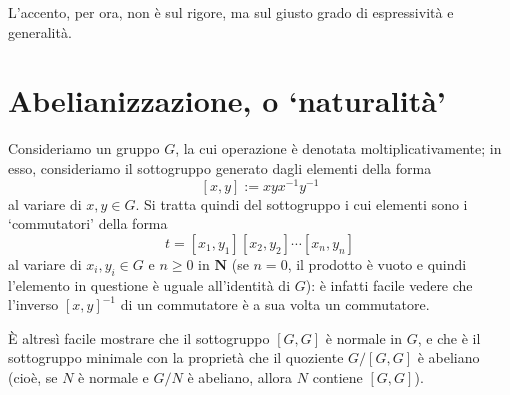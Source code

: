 L'accento, per ora, non è sul rigore, ma sul giusto grado di espressività e generalità.
\section*{Abelianizzazione, o `naturalità'}
Consideriamo un gruppo $G$, la cui operazione è denotata moltiplicativamente; in esso, consideriamo il sottogruppo generato dagli elementi della forma
\[[x,y]:= xyx^{-1}y^{-1}\]
al variare di $x,y\in G$. Si tratta quindi del sottogruppo i cui elementi sono i `commutatori' della forma
\[t = [x_1,y_1][x_2,y_2]\cdots[x_n,y_n]\]
al variare di $x_i,y_i\in G$ e $n\ge 0$ in $\mathbf{N}$ (se $n=0$, il prodotto è vuoto e quindi l'elemento in questione è uguale all'identità di $G$): è infatti facile vedere che l'inverso $[x,y]^{-1}$ di un commutatore è a sua volta un commutatore.

\`E altresì facile mostrare che il sottogruppo $[G,G]$ è normale in $G$, e che è il sottogruppo minimale con la proprietà che il quoziente $G/[G,G]$ è abeliano (cioè, se $N$ è normale e $G/N$ è abeliano, allora $N$ contiene $[G,G]$).

